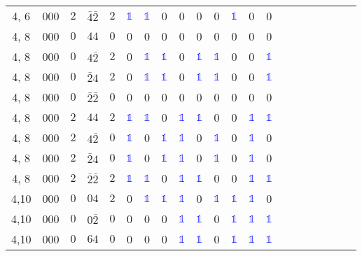 \begin{longtable*}{c| cccccccccccccccccccc }
4, 6& 000& $2$& $\bar{4}\bar{2}$& $2$& \textcolor{blue}{$\mathds{1}$}& \textcolor{blue}{$\mathds{1}$}& 0& 0& 0& 0& \textcolor{blue}{$\mathds{1}$}& 0& 0\\
4, 8& 000& $0$& $44$& $0$& 0& 0& 0& 0& 0& 0& 0& 0& 0\\
4, 8& 000& $0$& $4\bar{2}$& $2$& 0& \textcolor{blue}{$\mathds{1}$}& \textcolor{blue}{$\mathds{1}$}& 0& \textcolor{blue}{$\mathds{1}$}& \textcolor{blue}{$\mathds{1}$}& 0& 0& \textcolor{blue}{$\mathds{1}$}\\
4, 8& 000& $0$& $\bar{2}4$& $2$& 0& \textcolor{blue}{$\mathds{1}$}& \textcolor{blue}{$\mathds{1}$}& 0& \textcolor{blue}{$\mathds{1}$}& \textcolor{blue}{$\mathds{1}$}& 0& 0& \textcolor{blue}{$\mathds{1}$}\\
4, 8& 000& $0$& $\bar{2}\bar{2}$& $0$& 0& 0& 0& 0& 0& 0& 0& 0& 0\\
4, 8& 000& $2$& $44$& $2$& \textcolor{blue}{$\mathds{1}$}& \textcolor{blue}{$\mathds{1}$}& 0& \textcolor{blue}{$\mathds{1}$}& \textcolor{blue}{$\mathds{1}$}& 0& 0& \textcolor{blue}{$\mathds{1}$}& \textcolor{blue}{$\mathds{1}$}\\
4, 8& 000& $2$& $4\bar{2}$& $0$& \textcolor{blue}{$\mathds{1}$}& 0& \textcolor{blue}{$\mathds{1}$}& \textcolor{blue}{$\mathds{1}$}& 0& \textcolor{blue}{$\mathds{1}$}& 0& \textcolor{blue}{$\mathds{1}$}& 0\\
4, 8& 000& $2$& $\bar{2}4$& $0$& \textcolor{blue}{$\mathds{1}$}& 0& \textcolor{blue}{$\mathds{1}$}& \textcolor{blue}{$\mathds{1}$}& 0& \textcolor{blue}{$\mathds{1}$}& 0& \textcolor{blue}{$\mathds{1}$}& 0\\
4, 8& 000& $2$& $\bar{2}\bar{2}$& $2$& \textcolor{blue}{$\mathds{1}$}& \textcolor{blue}{$\mathds{1}$}& 0& \textcolor{blue}{$\mathds{1}$}& \textcolor{blue}{$\mathds{1}$}& 0& 0& \textcolor{blue}{$\mathds{1}$}& \textcolor{blue}{$\mathds{1}$}\\
4,10& 000& $0$& $04$& $2$& 0& \textcolor{blue}{$\mathds{1}$}& \textcolor{blue}{$\mathds{1}$}& \textcolor{blue}{$\mathds{1}$}& 0& \textcolor{blue}{$\mathds{1}$}& \textcolor{blue}{$\mathds{1}$}& \textcolor{blue}{$\mathds{1}$}& 0\\
4,10& 000& $0$& $0\bar{2}$& $0$& 0& 0& 0& \textcolor{blue}{$\mathds{1}$}& \textcolor{blue}{$\mathds{1}$}& 0& \textcolor{blue}{$\mathds{1}$}& \textcolor{blue}{$\mathds{1}$}& \textcolor{blue}{$\mathds{1}$}\\
4,10& 000& $0$& $64$& $0$& 0& 0& 0& \textcolor{blue}{$\mathds{1}$}& \textcolor{blue}{$\mathds{1}$}& 0& \textcolor{blue}{$\mathds{1}$}& \textcolor{blue}{$\mathds{1}$}& \textcolor{blue}{$\mathds{1}$}\\

\end{longtable*}
